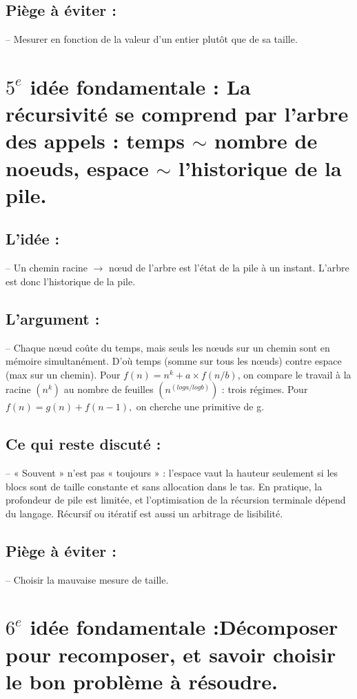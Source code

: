 \documentclass{article}
\begin{document}
\subsection*{\textbf{Piège à éviter} :}
\qquad -- Mesurer en fonction de la valeur d'un entier plutôt que de sa taille.

\section*{\textbf{$5^e$ idée fondamentale} : La récursivité se comprend par l'arbre des appels : temps $\sim$ nombre de noeuds, espace $\sim$ l'historique de la pile.}


\subsection*{\textbf{L'idée} :}
\qquad -- Un chemin racine $\longrightarrow$ nœud de l'arbre est l'état de la pile à un instant. L'arbre est donc l'historique de la pile.


\subsection*{\textbf{L'argument} :}
\qquad -- Chaque nœud coûte du temps, mais seuls les nœuds sur un chemin sont en mémoire simultanément. D'où temps (somme sur tous les nœuds) contre espace (max sur un chemin). Pour $f(n) = n^k + a \times f(n/b)$, on compare le travail à la racine $(n^k)$ au nombre de feuilles $(n^{(log a/log b)})$ : trois régimes. Pour $f(n) = g(n) + f(n-1),$ on cherche une primitive de g.


\subsection*{\textbf{Ce qui reste discuté} :}
\qquad -- « Souvent » n'est pas « toujours » : l'espace vaut la hauteur seulement si les blocs sont de taille constante et sans allocation dans le tas. En pratique, la profondeur de pile est limitée, et l'optimisation de la récursion terminale dépend du langage. Récursif ou itératif est aussi un arbitrage de lisibilité.


\subsection*{\textbf{Piège à éviter} :}
\qquad -- Choisir la mauvaise mesure de taille.

\section*{\textbf{$6^e$ idée fondamentale} :Décomposer pour recomposer, et savoir choisir le bon problème à résoudre.}
\end{document}
